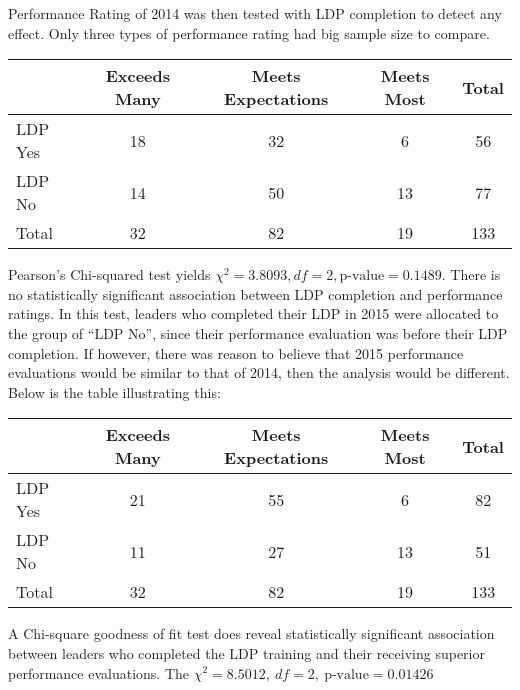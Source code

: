 \documentclass[11pt]{extarticle} %
\begin{document}
Performance Rating of 2014 was then tested with LDP completion to detect any effect. Only three types of performance rating had big sample size to compare. 
\begin{table}[H]
\centering
\begin{tabular}{lcccc}
 \hline
 & Exceeds Many & Meets Expectations & Meets Most & Total\\ 
 \hline
 LDP Yes &  18 &  32 &   6 & 56\\ 
 LDP No &  14 &  50 &  13 & 77\\ 
 \hline
 Total & 32 & 82 & 19 & 133 \\
 \hline
\end{tabular}
\end{table}
Pearson's Chi-squared test yields $\chi^2 = 3.8093, df = 2, \text{p-value} = 0.1489$. There is no statistically significant association between LDP completion and performance ratings. In this test, leaders who completed their LDP in 2015 were allocated to the group of ``LDP No'', since their performance evaluation was before their LDP completion. If however, there was reason to believe that 2015 performance evaluations would be similar to that of 2014, then the analysis would be different. Below is the table illustrating this:
\begin{table}[H]
\centering
\begin{tabular}{lcccc}
\hline
& Exceeds Many & Meets Expectations & Meets Most & Total\\ 
\hline
LDP Yes &  21 &  55 &   6  & 82\\ 
LDP No &  11 &  27 &  13 & 51\\ 
\hline
Total & 32 & 82 & 19 & 133 \\
\hline
\end{tabular}
\end{table}
A Chi-square goodness of fit test does reveal statistically significant association between leaders who completed the LDP training and their receiving superior performance evaluations. The $\chi^2 = 8.5012,\ df = 2,\  \text{p-value} = 0.01426$
\end{document}
